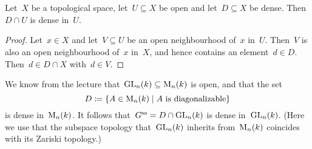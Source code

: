 \section{}


\begin{lemma}
  Let~$X$ be a topological space, let~$U \subseteq X$ be open and let~$D \subseteq X$ be dense.
  Then~$D \cap U$ is dense in~$U$.
\end{lemma}

\begin{proof}
  Let~$x \in X$ and let~$V \subseteq U$ be an open neighbourhood of~$x$ in~$U$.
  Then~$V$ is also an open neighbourhood of~$x$ in~$X$, and hence contains an element~$d \in D$.
  Then~$d \in D \cap X$ with~$d \in V$.
\end{proof}

We know from the lecture that~$\operatorname{GL}_n(k) \subseteq \operatorname{M}_{n}(k)$ is open, and that the set
\[
  D
  \defined
  \{
    A \in \mat{n}{k}
  \suchthat
    \text{$A$ is diagonalizable}
  \}
\]
is dense in~$\operatorname{M}_{n}(k)$.
It follows that~$G^{\mathrm{ss}} = D \cap \operatorname{GL}_n(k)$ is dense in~$\operatorname{GL}_n(k)$.
(Here we use that the subspace topology that~$\operatorname{GL}_n(k)$ inherits from~$\operatorname{M}_{n}(k)$ coincides with its Zariski topology.)

